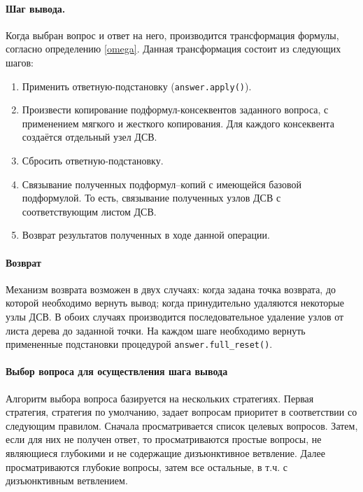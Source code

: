 \paragraph{Шаг вывода.} Когда выбран вопрос и ответ на него, производится трансформация формулы, согласно определению \ref{omega}.
Данная трансформация состоит из следующих шагов:
\begin{enumerate}
\item Применить ответную-подстановку (\texttt{answer.apply()}).
\item Произвести копирование подформул-консеквентов заданного вопроса, с применением мягкого и жесткого копирования. Для каждого консеквента создаётся отдельный узел ДСВ.
\item Сбросить ответную-подстановку.
\item Связывание полученных подформул--копий с имеющейся базовой подформулой. То есть, связывание полученных узлов ДСВ с соответствующим листом ДСВ.
\item Возврат результатов полученных в ходе данной операции.
\end{enumerate}


\paragraph{Возврат}%
Механизм возврата возможен в двух случаях: когда задана точка возврата, до которой необходимо вернуть вывод; когда принудительно удаляются некоторые узлы ДСВ. В обоих случаях производится последовательное удаление узлов от листа дерева до заданной точки. На каждом шаге необходимо вернуть примененные подстановки процедурой \texttt{answer.full\_reset()}.


\paragraph{Выбор вопроса для осуществления шага вывода} %
Алгоритм выбора вопроса базируется на нескольких стратегиях. Первая стратегия, стратегия по умолчанию, задает вопросам приоритет в соответствии со следующим правилом. Сначала просматривается список целевых вопросов. Затем, если для них не получен ответ, то просматриваются простые вопросы, не являющиеся глубокими и не содержащие дизъюнктивное ветвление. Далее просматриваются глубокие вопросы, затем все остальные, в т.ч. с дизъюнктивным ветвлением.

